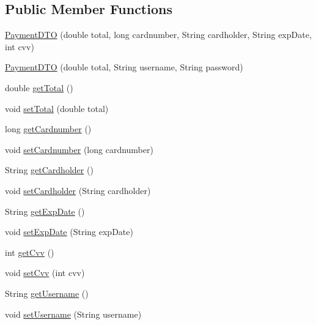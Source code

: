 \subsection*{Public Member Functions}
\begin{DoxyCompactItemize}
\item 
\mbox{\hyperlink{class_s_p_q_1_1dto_1_1_payment_d_t_o_a4a6f91d0976ce0af97a8f7f15658294c}{Payment\+D\+TO}} (double total, long cardnumber, String cardholder, String exp\+Date, int cvv)
\item 
\mbox{\hyperlink{class_s_p_q_1_1dto_1_1_payment_d_t_o_ab51beb9eef60e0b57b11bab85ce42454}{Payment\+D\+TO}} (double total, String username, String password)
\item 
double \mbox{\hyperlink{class_s_p_q_1_1dto_1_1_payment_d_t_o_a04cd2104d07971407126fcf75ef17d5b}{get\+Total}} ()
\item 
void \mbox{\hyperlink{class_s_p_q_1_1dto_1_1_payment_d_t_o_a07f242511a5b2cd45fdf771203729c1b}{set\+Total}} (double total)
\item 
long \mbox{\hyperlink{class_s_p_q_1_1dto_1_1_payment_d_t_o_ac2a8a2ab315f3027f25780a84da0b824}{get\+Cardnumber}} ()
\item 
void \mbox{\hyperlink{class_s_p_q_1_1dto_1_1_payment_d_t_o_a2b84f1e7da9d3d9966d5170ae0595839}{set\+Cardnumber}} (long cardnumber)
\item 
String \mbox{\hyperlink{class_s_p_q_1_1dto_1_1_payment_d_t_o_ac4812465bc4dd874aad6269fe8486e0b}{get\+Cardholder}} ()
\item 
void \mbox{\hyperlink{class_s_p_q_1_1dto_1_1_payment_d_t_o_a5eea0a93b97ba73b36358c6f5e0ca42e}{set\+Cardholder}} (String cardholder)
\item 
String \mbox{\hyperlink{class_s_p_q_1_1dto_1_1_payment_d_t_o_aa91402a8c96a306fcf125973e4f35912}{get\+Exp\+Date}} ()
\item 
void \mbox{\hyperlink{class_s_p_q_1_1dto_1_1_payment_d_t_o_a6d3d88f07321648bc17e385432ee9044}{set\+Exp\+Date}} (String exp\+Date)
\item 
int \mbox{\hyperlink{class_s_p_q_1_1dto_1_1_payment_d_t_o_a64fb9df59333fcc2a0c8bea48024354d}{get\+Cvv}} ()
\item 
void \mbox{\hyperlink{class_s_p_q_1_1dto_1_1_payment_d_t_o_aee98ca86c3d7e05f98e387faa4f5a3d4}{set\+Cvv}} (int cvv)
\item 
String \mbox{\hyperlink{class_s_p_q_1_1dto_1_1_payment_d_t_o_a31d0edbb3ec64b406e70cd3deaa5ab1a}{get\+Username}} ()
\item 
void \mbox{\hyperlink{class_s_p_q_1_1dto_1_1_payment_d_t_o_aaad1620f8f86cb26566476c22bfcd3af}{set\+Username}} (String username)

\end{DoxyCompactItemize}
